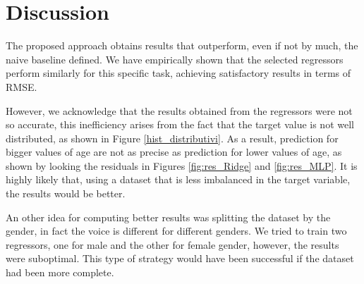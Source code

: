 \documentclass[conference]{IEEEtran}
\begin{document}
\section{Discussion}
The proposed approach obtains results that
outperform, even if not by much, the naive baseline defined. We have empirically shown that the selected regressors perform similarly for this specific task, achieving satisfactory results in terms of RMSE.
 
However, we acknowledge that the results obtained from the regressors were not so accurate, this inefficiency arises from the fact that the target value is not well distributed, as shown in Figure \ref{hist_distributivi}. As a result, prediction for bigger values of age are not as precise as prediction for lower values of age, as shown by looking the residuals in Figures \ref{fig:res_Ridge} and \ref{fig:res_MLP}. It is highly likely that, using a dataset that is less imbalanced in the target variable, the results would be better. 

An other idea for computing better results was splitting the dataset by the gender, in fact the voice is different for different genders. We tried to train two regressors, one for male and the other for female gender, however, the results were suboptimal. This type of strategy would have been successful if the dataset had been more complete.







\end{document}
